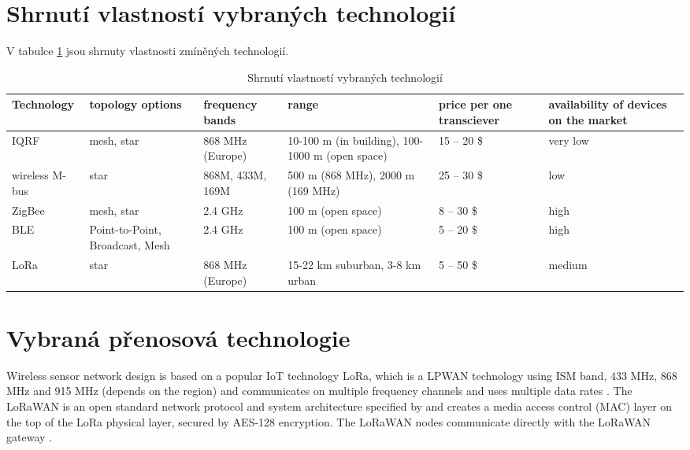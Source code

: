 \section{Shrnutí vlastností vybraných technologií}
V tabulce \ref{tab:shrnutiTechnologii} jsou shrnuty vlastnosti zmíněných technologií.   


\begin{table}[]
  \begin{tabular}{|p{1.5cm}||p{2cm}|p{2cm}|p{2cm}|p{2cm}|p{2cm}|}
  \hline
  Technology    & topology options                & frequency bands  & range                                           & price per one transciever & availability of devices on the market \\ \hline \hline
  IQRF           & mesh, star                      & 868 MHz (Europe) & 10-100 m (in building), 100-1000 m (open space) & 15 – 20 \$                & very low                              \\ \hline
  wireless M-bus & star                            & 868M, 433M, 169M & 500 m (868 MHz), 2000 m (169 MHz)               & 25 – 30 \$                & low                                   \\ \hline
  ZigBee         & mesh, star                      & 2.4 GHz          & 100 m (open space)                              & 8 – 30 \$                 & high                                  \\ \hline
  BLE            & Point-to-Point, Broadcast, Mesh & 2.4 GHz          & 100 m (open space)                              & 5 – 20 \$                 & high                                  \\ \hline
  LoRa           & star                            & 868 MHz (Europe) & 15-22 km suburban, 3-8 km urban                 & 5 – 50 \$                 & medium                                \\ \hline
  \end{tabular}
  \caption{Shrnutí vlastností vybraných technologií}
  \label{tab:shrnutiTechnologii}
\end{table}


\section{Vybraná přenosová technologie}
Wireless sensor network design is based on a popular IoT technology LoRa, which is a LPWAN technology using ISM band, 433 MHz, 868 MHz and 915 MHz (depends on the region) and communicates on multiple frequency channels and uses multiple data rates \cite{LoRaWAN Evaluation for IoT Communications}.
The LoRaWAN is an open standard network protocol and system architecture specified by \cite{LoRaWAN specification} and creates a media access control (MAC) layer on the top of the LoRa physical layer, secured by AES-128 encryption.
The LoRaWAN nodes communicate directly with the LoRaWAN gateway \cite{Internet of Things (IoT) using LoRa technology}.


